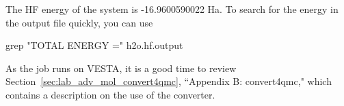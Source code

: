 The HF energy of the
system is -16.9600590022 Ha. To search for the energy in the output file quickly, you can
use 
\begin{shade}
grep "TOTAL ENERGY =" h2o.hf.output
\end{shade}
As the job runs on VESTA, it is a good time to review Section~\ref{sec:lab_adv_mol_convert4qmc}, ``Appendix B: convert4qmc," which contains a description on the use of the converter.


